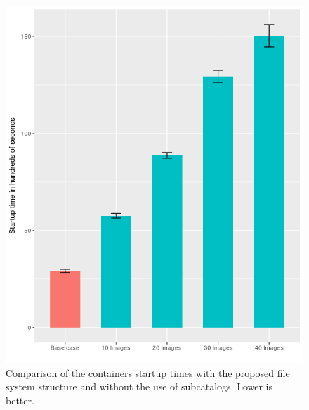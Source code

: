
\begin{figure}[h]{}
    \includegraphics[scale=0.7]{gfx/runtime-catalog-ic}
        \caption{Comparison of the containers startup times with the proposed file system structure and without the use of subcatalogs. Lower is better.}
        \label{fig:startup-time}
\end{figure}


